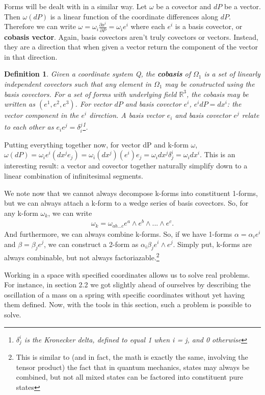 \documentclass{book}
\newtheorem{defn}[equation]{Definition}
\begin{document}
Forms will be dealt with in a similar way. Let $\omega$ be a covector and $dP$ be a vector. Then $\omega(dP)$ is a linear function of the coordinate differences along $dP$. Therefore we can write $\omega = \omega_i \frac{\partial x^i}{\partial P} = \omega_i e^i$ where each $e^i$ is a basis covector, or \textbf{cobasis vector}. Again, basis covectors aren't truly covectors or vectors. Instead, they are a direction that when given a vector return the component of the vector in that direction. 

\begin{defn}
	Given a coordinate system Q, the \textbf{cobasis} of $\Omega_1$ is a set of linearly independent covectors such that any element in $\Omega_1$ may be constructed using the basis covectors. For a set of forms with underlying field $\mathbb{R}^3$, the cobasis may be written as $(e^1, e^2, e^3)$. For vector $dP$ and basis covector $e^i$, $e^i dP = dx^i$: the vector component in the $e^i$ direction. A basis vector $e_i$ and basis covector $e^j$ relate to each other as $e_ie^j = \delta^j_i$\footnote{$\delta^i_j$ is the Kronecker delta, defined to equal 1 when i = j, and 0 otherwise}. 
\end{defn}
 

Putting everything together now, for vector dP and k-form $\omega$, $\omega(dP) = \omega_ie^i(dx^je_j) = \omega_i(dx^j)(e^i)e_j = \omega_idx^j\delta^i_j = \omega_i dx^i$. This is an interesting result: a vector and covector together naturally simplify down to a linear combination of infinitesimal segments. 

We note now that we cannot always decompose k-forms into constituent 1-forms, but we can always attach a k-form to a wedge series of basis covectors. So, for any k-form $\omega_k$, we can write \begin{gather} \omega_k = \omega_{ab...c}e^a\wedge e^b \wedge ... \wedge e^c. \end{gather} And furthermore, we can always combine k-forms. So, if we have 1-forms $\alpha = \alpha_i e^i$ and $\beta = \beta_j e^j$, we can construct a 2-form as $\alpha_i\beta_j e^i\wedge e^j$. Simply put, k-forms are always combinable, but not always factoriazable.\footnote{This is similar to (and in fact, the math is exactly the same, involving the tensor product) the fact that in quantum mechanics, states may always be combined, but not all mixed states can be factored into constituent pure states}

Working in a space with specified coordinates allows us to solve real problems. For instance, in section 2.2 we got slightly ahead of ourselves by describing the oscillation of a mass on a spring with specific coordinates without yet having them defined. Now, with the tools in this section, such a problem is possible to solve.  
\end{document}
